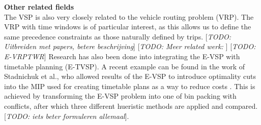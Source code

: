 \documentclass[ht]{article}
\newcommand{\todo}[1]{{\color{red}[\textit{TODO: #1}]}}
\begin{document}
\noindent \textbf{Other related fields}\\
The VSP is also very closely related to the vehicle routing problem (VRP). The VRP with time windows is of particular interest, as this allows us to define the same precedence constraints as those naturally defined by trips. \todo{Uitbreiden met papers, betere beschrijving}
\todo{Meer related werk: }
\todo{E-VRPTWR}
Research has also been done into integrating the E-VSP with timetable planning (E-TVSP). A recent example can be found in the work of Stadnichuk et al., who allowed results of the E-VSP to introduce optimality cuts into the MIP used for creating timetable plans as a way to reduce costs \cite{Stadnichuk2024}. This is achieved by transforming the E-VSP problem into one of bin packing with conflicts, after which three different hueristic methods are applied and compared. \todo{iets beter formuleren allemaal}. \\\\
\end{document}
